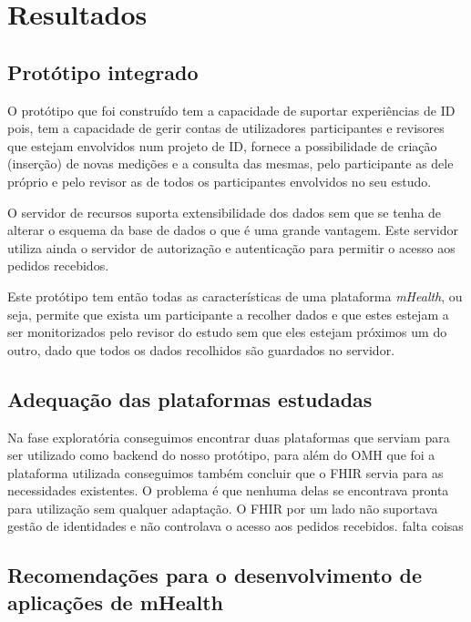 \chapter{Resultados}
\section{Protótipo integrado}

O protótipo que foi construído tem a capacidade de suportar experiências de \gls{ID} pois, tem a capacidade de gerir contas de utilizadores participantes e revisores que estejam envolvidos num projeto de \gls{ID}, fornece a possibilidade de criação (inserção) de novas medições e a consulta das mesmas, pelo participante as dele próprio e pelo revisor as de todos os participantes envolvidos no seu estudo.\par
O servidor de recursos suporta extensibilidade dos dados sem que se tenha de alterar o esquema da base de dados o que é uma grande vantagem. Este servidor utiliza ainda o servidor de autorização e autenticação para permitir o acesso aos pedidos recebidos. \par
Este protótipo tem então todas as características de uma plataforma \textit{mHealth}, ou seja, permite que exista um participante a recolher dados e que estes estejam a ser monitorizados pelo revisor do estudo sem que eles estejam próximos um do outro, dado que todos os dados recolhidos são guardados no servidor.

\section{Adequação das plataformas estudadas}

Na fase exploratória conseguimos encontrar duas plataformas que serviam para ser utilizado como backend do nosso protótipo, para além do \gls{OMH} que foi a plataforma utilizada conseguimos também concluir que o \gls{FHIR} servia para as necessidades existentes. O problema é que nenhuma delas se encontrava pronta para utilização sem qualquer adaptação. O \gls{FHIR} por um lado não suportava gestão de identidades e não controlava o acesso aos pedidos recebidos. falta coisas

\section{Recomendações para o desenvolvimento de aplicações de mHealth}


\cleardoublepage